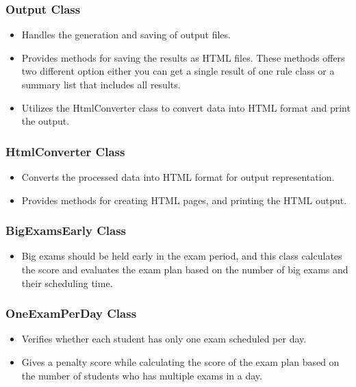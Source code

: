 \subsubsection{Output Class}


\begin{itemize}
\item Handles the generation and saving of output files.
\item Provides methods for saving the results as HTML files. These methods offers two different option either you can get a single result of one rule class or a summary list that includes all results.
\item Utilizes the HtmlConverter class to convert data into HTML format and print the output.
\end{itemize}


\subsubsection{HtmlConverter Class}


\begin{itemize}
\item Converts the processed data into HTML format for output representation.
\item Provides methods for creating HTML pages, and printing the HTML output.

\end{itemize}


\subsubsection{BigExamsEarly Class}


\begin{itemize}
\item Big exams should be held early in the exam period, and this class calculates the score and evaluates the exam plan based on the number of big exams and their scheduling time.
\end{itemize}


\subsubsection{OneExamPerDay Class}


\begin{itemize}
\item Verifies whether each student has only one exam scheduled per day.
\item Gives a penalty score while calculating the score of the exam plan based on the number of students who has multiple exams in a day.
\end{itemize}

